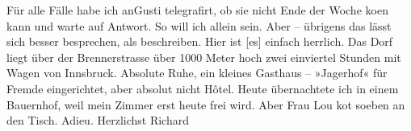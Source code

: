 \begin{ledgroupsized}[t]{13cm}
           \pstart
           Für alle Fälle habe ich \introOben{}an\introOben{}{ }Gusti telegrafirt, ob sie nicht
               Ende der Woche ko{\geminationm}en kann und warte auf Antwort. So will
               ich allein sein. Aber – übrigens das lässt sich besser besprechen, als beschreiben.
               Hier ist {\pb}{[}es{]} einfach herrlich. Das Dorf liegt über der Brennerstrasse über 1000 Meter hoch zwei einviertel Stunden mit
               Wagen von Innsbruck. Absolute Ruhe, ein kleines
               Gasthaus – »Jagerhof« für Fremde eingerichtet, aber
               absolut nicht Hôtel. Heute übernachtete ich in einem Bauernhof, weil mein Zimmer erst
               heute frei wird. Aber Frau Lou ko{\geminationm}t soeben an den Tisch. Adieu.\pend
           \pstart Herzlichst \spacefill\mbox{Richard}\pend{}\endnumbering{}\end{ledgroupsized}  \newcommand{\dateiname}{L00480}\newcommand{\titel}{Richard Beer-Hofmann an Arthur Schnitzler, 10. 9. 1895}\newcommand{\editorInnen}{Martin Anton Müller und Gerd-Hermann Susen}
      